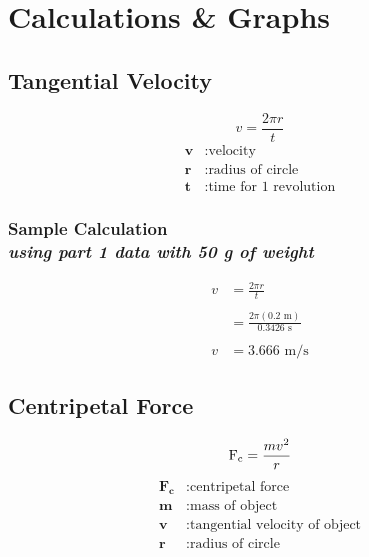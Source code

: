 
\section{Calculations \& Graphs}

\vspace{-0.5cm}
\singlespacing


\subsection{Tangential Velocity} 

{\centering
\begin{equation}
	v =  \frac{2 \pi r}{t} 
	\label{eq:tvelocity}
\end{equation}
\begin{align*}
	\mathbf{v} &: \text{velocity} \\
	\mathbf{r} &: \text{radius of circle} \\
	\mathbf{t} &: \text{time for 1 revolution}
\end{align*}}

\subsubsection{Sample Calculation \\ {\normalfont \small\textit{using part 1 data with 50 g of weight}}}

{\centering
\begin{align*}
	v &=  \frac{2 \pi r}{t} \\ \\
		&=  \frac{2 \pi (0.2\text{ m})}{0.3426\text{ s}} \\ \\
	v	&= \boxed{3.666 \text{ m/s}} 
\end{align*}}


\subsection{Centripetal Force} 

{\centering
\begin{equation}
	\text{F\textsubscript{c}} = \frac{mv^2}{r}
	\label{eq:centriForce}
\end{equation}
\begin{align*}
	\mathbf{F_c} &: \text{centripetal force} \\
	\mathbf{m} &: \text{mass of object} \\
	\mathbf{v} &: \text{tangential velocity of object} \\
	\mathbf{r} &: \text{radius of circle}
\end{align*}}

